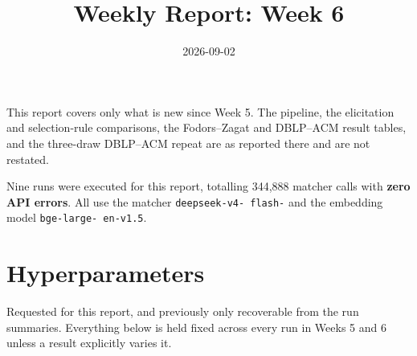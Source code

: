 \documentclass[11pt]{article}
\title{Weekly Report: Week 6}
\author{}
\date{2026-09-02}
\begin{document}
\maketitle

This report covers only what is new since Week 5. The pipeline, the elicitation and
selection-rule comparisons, the Fodors--Zagat and DBLP--ACM result tables, and the
three-draw DBLP--ACM repeat are as reported there and are not restated.

Nine runs were executed for this report, totalling 344{,}888 matcher calls with
\textbf{zero API errors}. All use the matcher \texttt{deepseek-\allowbreak v4-\allowbreak
flash-} and the embedding model \texttt{bge-\allowbreak large-\allowbreak
en-\allowbreak v1.5}.

\section{Hyperparameters}
\label{sec:hyper}

Requested for this report, and previously only recoverable from the run summaries. Everything
below is held fixed across every run in Weeks 5 and 6 unless a result explicitly varies it.
\end{document}
